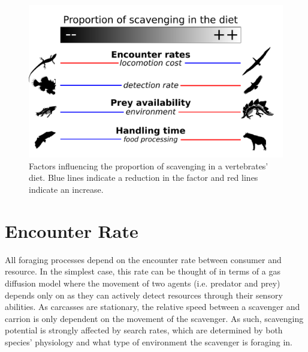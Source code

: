 \documentclass[a4paper,12pt]{article}
\begin{document}
\begin{figure}[!htbp]
\centering
   \includegraphics[width=1\textwidth]{Summary_figure/Summary_figure_Landscape.pdf}
\caption{Factors influencing the proportion of scavenging in a vertebrates' diet. Blue lines indicate a reduction in the factor and red lines indicate an increase.}
\label{Summary_figure}
\end{figure}

\section*{Encounter Rate}
All foraging processes depend on the encounter rate between consumer and resource. 
In the simplest case, this rate can be thought of in terms of a gas diffusion model where the movement of two agents (i.e. predator and prey) depends only on as they can actively detect resources through their sensory abilities. %
As carcasses are stationary, the relative speed between a scavenger and carrion is only dependent on the movement of the scavenger.
As such, scavenging potential is strongly affected by search rates, which are determined by both species' physiology and what type of environment the scavenger is foraging in.
\end{document}
